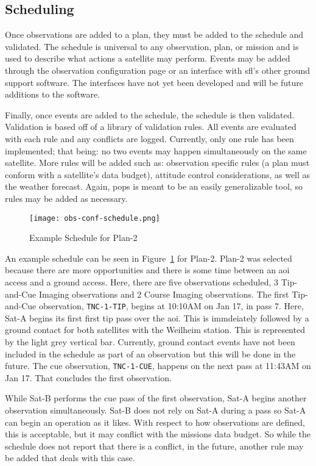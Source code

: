 \subsection{Scheduling}


Once observations are added to a plan, they must be added to the schedule and
validated. The schedule is universal to any observation, plan, or mission and
is used to describe what actions a satellite may perform. Events may be added
through the observation configuration page or an interface with \gls{sfl}’s
other ground support software. The interfaces have not yet been developed and
will be future additions to the software.

Finally, once events are added to the schedule, the schedule is then validated.
Validation is based off of a library of validation rules. All events are
evaluated with each rule and any conflicts are logged. Currently, only one rule
has been implemented; that being: no two events may happen simultaneously on
the same satellite. More rules will be added such as: observation specific
rules (a plan must conform with a satellite’s data budget), attitude control
considerations, as well as the weather forecast. Again, \gls{pops} is meant to
be an easily generalizable tool, so rules may be added as necessary.


\begin{figure}[h]
    \centering
    \texttt{[image: obs-conf-schedule.png]} 
    \caption{Example Schedule for Plan-2}
    \label{fig:obs-conf-schedule}
\end{figure}

An example schedule can be seen in Figure~\ref{fig:obs-conf-schedule} for
Plan-2. Plan-2 was selected because there are more opportunities and there is
some time between an \gls{aoi} access and a ground access. Here, there are five
observations scheduled, 3 Tip-and-Cue Imaging observations and 2 Course Imaging
observations. The first Tip-and-Cue observation, \texttt{TNC-1-TIP}, begins at
10:10AM on Jan 17, in pass 7. Here, Sat-A begins its first first tip pass over
the \gls{aoi}.  This is immdeiately followed by a ground contact for both
satellites with the Weilheim station. This is represented by the light grey
vertical bar.  Currently, ground contact events have not been included in the
schedule as part of an observation but this will be done in the future.  The
cue observation, \texttt{TNC-1-CUE}, happens on the next pass at 11:43AM on Jan
17.  That concludes the first observation.

While Sat-B performs the cue pass of the first observation, Sat-A begins
another observation simultaneously. Sat-B does not rely on Sat-A during a pass
so Sat-A can begin an operation as it likes. With respect to how observations
are defined, this is acceptable, but it may conflict with the missions data
budget. So while the schedule does not report that there is a conflict, in the
future, another rule may be added that deals with this case.

